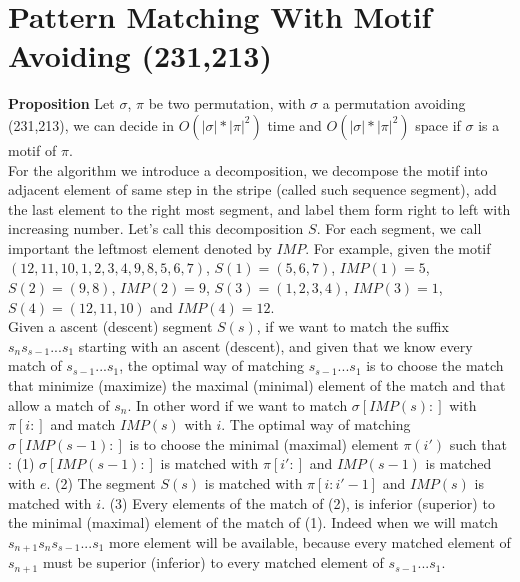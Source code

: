 \documentclass[a4paper]{llncs}
\newcommand{\ptext}{\pi}
\newcommand{\pmotif}{\sigma}
\newcounter{num}
\newcommand{\num}{\stepcounter{num} }
\begin{document}
		
		\section{Pattern Matching With Motif Avoiding (231,213)}	

			\textbf{Proposition  \num \thenum} Let $\pmotif$, $\ptext$ 
			be two permutation,
			with  $\pmotif$ a permutation avoiding (231,213), 
			we can decide in $O(|\pmotif|*|\ptext|^2)$ time
			and $O(|\pmotif|*|\ptext|^2)$ space
			if $\pmotif$ 
			is a motif of $\ptext$.\\
			
			
			For the algorithm we introduce a decomposition,
			we decompose the motif into
			adjacent element of same step in the stripe 
			(called such sequence segment),
			add the last element to the right most segment,
			and label them form right to left
			with increasing number.
			Let's call this decomposition $S$.
			For each segment, we call important 
			the leftmost element denoted by $IMP$.
			For example, given the motif $(12,11,10,1,2,3,4,9,8,5,6,7)$,
			$S(1)=(5,6,7)$, $IMP(1)=5$, 
			$S(2)=(9,8)$, $IMP(2)=9$, 
			$S(3)=(1,2,3,4)$, $IMP(3)=1$, 
			$S(4)=(12,11,10)$ and $IMP(4)=12$.\\
			
			Given a ascent (descent) segment $S(s)$,
			if we want to
			match the suffix $s_ns_{s-1}...s_1$
			starting with an ascent (descent),
			and given that we know every
			match of $s_{s-1}...s_1$,
			the optimal way of matching
			$s_{s-1}...s_1$
			is to choose the match
			that minimize (maximize)
			the maximal (minimal)
			element of the match
			and that allow a match
			of $s_n$.			
			In other word if we want to match 
			$\pmotif[IMP(s):]$
			with $\ptext[i:]$
			and match $IMP(s)$
			with $i$.
			The optimal way
			of matching
			$\pmotif[IMP(s-1):]$
			is to choose the
			minimal (maximal) element $\ptext(i')$
			such that :
			(1) $\pmotif[IMP(s-1):]$ is matched with $\ptext[i':]$
			and $IMP(s-1)$ is matched with $e$.
			(2) The segment $S(s)$ is matched with $\ptext[i:i'-1]$
			and $IMP(s)$ is matched with $i$.
			(3) Every elements of the match of (2),
			is inferior (superior) to the minimal (maximal) element of the match of (1).
			Indeed when we will 
			match $s_{n+1}s_ns_{s-1}...s_1$
			more element will be available,
			because every matched 
			element of $s_{n+1}$
			must be superior (inferior)
			to every matched element
			of $s_{s-1}...s_1$.\\
			  
\end{document}
